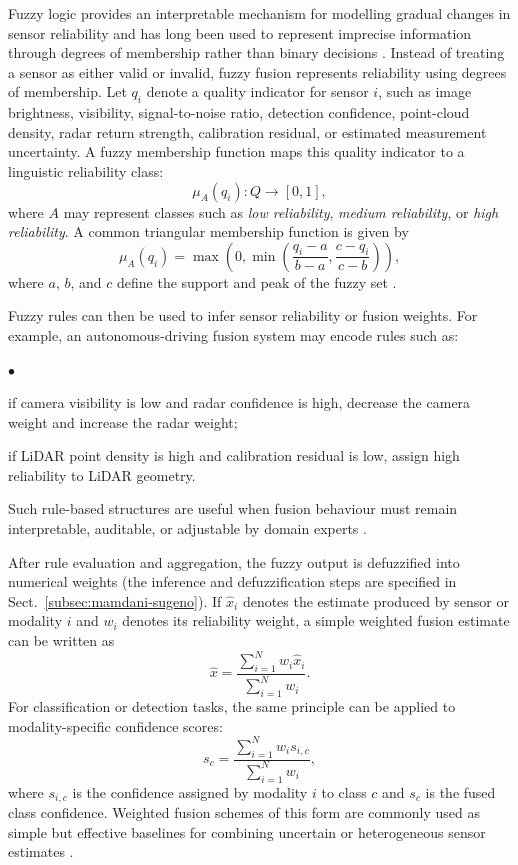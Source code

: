 \documentclass[graybox,envcountchap]{style/SNmono}
\newenvironment{list4a}{
  \begin{list}{$\bullet$}{
      \setlength{\itemsep}{0.05cm}
      \setlength{\labelsep}{0.2cm}
      \setlength{\labelwidth}{0.3cm}
      \setlength{\parsep}{0in}
      \setlength{\parskip}{0in}
      \setlength{\topsep}{0in}
      \setlength{\partopsep}{0in}
      \setlength{\leftmargin}{0.16in}}}
      {\end{list}}
\begin{document}
Fuzzy logic provides an interpretable mechanism for modelling gradual changes in sensor reliability and has long been used to represent imprecise information through degrees of membership rather than binary decisions \cite{zadeh_fuzzy_1965}. Instead of treating a sensor as either valid or invalid, fuzzy fusion represents reliability using degrees of membership. Let $q_i$ denote a quality indicator for sensor $i$, such as image brightness, visibility, signal-to-noise ratio, detection confidence, point-cloud density, radar return strength, calibration residual, or estimated measurement uncertainty. A fuzzy membership function maps this quality indicator to a linguistic reliability class:
\begin{equation}
    \mu_A(q_i): Q \rightarrow [0,1],
\end{equation}
where $A$ may represent classes such as \emph{low reliability}, \emph{medium reliability}, or \emph{high reliability}. A common triangular membership function is given by
\begin{equation}
    \mu_A(q_i) =
    \max\left(0,
    \min\left(
    \frac{q_i-a}{b-a},
    \frac{c-q_i}{c-b}
    \right)\right),
\end{equation}
where $a$, $b$, and $c$ define the support and peak of the fuzzy set \cite{zadeh_fuzzy_1965}.

Fuzzy rules can then be used to infer sensor reliability or fusion weights. For example, an autonomous-driving fusion system may encode rules such as:
\begin{list4a}
    \item if camera visibility is low and radar confidence is high, decrease the camera weight and increase the radar weight;
    \item if LiDAR point density is high and calibration residual is low, assign high reliability to LiDAR geometry.
\end{list4a}
 Such rule-based structures are useful when fusion behaviour must remain interpretable, auditable, or adjustable by domain experts \cite{zadeh_fuzzy_1965, khaleghi_multisensor_2013}.

After rule evaluation and aggregation, the fuzzy output is defuzzified into numerical weights (the inference and defuzzification steps are specified in Sect.~\ref{subsec:mamdani-sugeno}). If $\hat{x}_i$ denotes the estimate produced by sensor or modality $i$ and $w_i$ denotes its reliability weight, a simple weighted fusion estimate can be written as
\begin{equation}
    \hat{x} =
    \frac{\sum_{i=1}^{N} w_i \hat{x}_i}{\sum_{i=1}^{N} w_i}.
\end{equation}
For classification or detection tasks, the same principle can be applied to modality-specific confidence scores:
\begin{equation}
    s_c =
    \frac{\sum_{i=1}^{N} w_i s_{i,c}}{\sum_{i=1}^{N} w_i},
\end{equation}
where $s_{i,c}$ is the confidence assigned by modality $i$ to class $c$ and $s_c$ is the fused class confidence. Weighted fusion schemes of this form are commonly used as simple but effective baselines for combining uncertain or heterogeneous sensor estimates \cite{hall_introduction_1997, khaleghi_multisensor_2013}.
\end{document}
